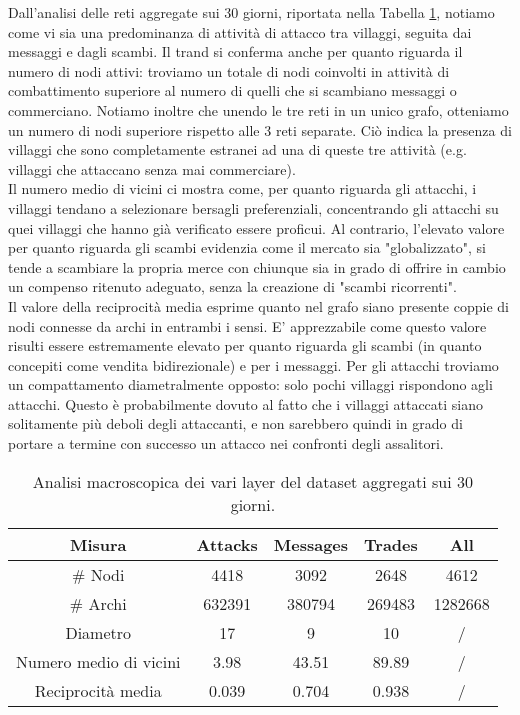 Dall'analisi delle reti aggregate sui 30 giorni, riportata nella Tabella \ref{tab:summary}, notiamo come vi sia una predominanza di attività di attacco tra villaggi, seguita dai messaggi e dagli scambi. Il trand si conferma anche per quanto riguarda il numero di nodi attivi: troviamo un totale di nodi coinvolti in attività di combattimento superiore al numero di quelli che si scambiano messaggi o commerciano. Notiamo inoltre che unendo le tre reti in un unico grafo, otteniamo un numero di nodi superiore rispetto alle 3 reti separate. Ciò indica la presenza di villaggi che sono completamente estranei ad una di queste tre attività (e.g. villaggi che attaccano senza mai commerciare).\\
Il numero medio di vicini ci mostra come, per quanto riguarda gli attacchi, i villaggi tendano a selezionare bersagli preferenziali, concentrando gli attacchi su quei villaggi che hanno già verificato essere proficui. Al contrario, l'elevato valore per quanto riguarda gli scambi evidenzia come il mercato sia "globalizzato", si tende a scambiare la propria merce con chiunque sia in grado di offrire in cambio un compenso ritenuto adeguato, senza la creazione di "scambi ricorrenti".\\
Il valore della reciprocità media esprime quanto nel grafo siano presente coppie di nodi connesse da archi in entrambi i sensi. E' apprezzabile come questo valore risulti essere estremamente elevato per quanto riguarda gli scambi (in quanto concepiti come vendita bidirezionale) e per i messaggi. Per gli attacchi troviamo un compattamento diametralmente opposto: solo pochi villaggi rispondono agli attacchi. Questo è probabilmente dovuto al fatto che i villaggi attaccati siano solitamente più deboli degli attaccanti, e non sarebbero quindi in grado di portare a termine con successo un attacco nei confronti degli assalitori.
\begin{table}[h]
	\centering
	\caption{Analisi macroscopica dei vari layer del dataset aggregati sui 30 giorni.}
	\begin{tabular}{|c|c|c|c|c|}
		\hline 
		Misura & Attacks & Messages & Trades & All \\ 
		\hline 
		\# Nodi & 4418 & 3092 & 2648 & 4612 \\ 
		\hline 
		\# Archi & 632391 & 380794 & 269483 & 1282668 \\ 
		\hline 
		Diametro & 17 & 9 & 10 & / \\ 
		\hline 
		Numero medio di vicini & 3.98 & 43.51 & 89.89 & / \\ 
		\hline 
		Reciprocità media & 0.039 & 0.704 & 0.938 & / \\ 
		\hline 
	\end{tabular} 
	\label{tab:summary}
\end{table}

